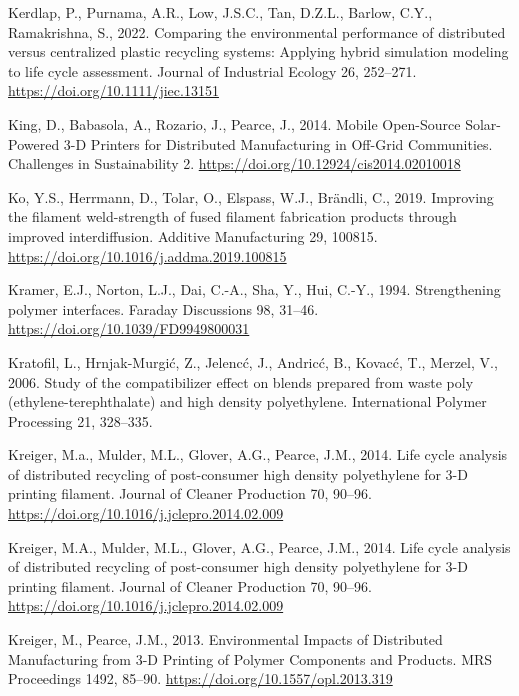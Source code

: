 \documentclass[
  12pt,
  number,
  review]{elsarticle}
\newlength{\cslhangindent}
\newlength{\cslentryspacingunit} %
\newenvironment{CSLReferences}[2] %
 {%
  \setlength{\parindent}{0pt}
  \ifodd #1
  \let\oldpar\par
  \def\par{\hangindent=\cslhangindent\oldpar}
  \fi
  \setlength{\parskip}{#2\cslentryspacingunit}
 }%
 {}
\begin{document}
\begin{CSLReferences}{1}{0}
\leavevmode{}%
Kerdlap, P., Purnama, A.R., Low, J.S.C., Tan, D.Z.L., Barlow, C.Y.,
Ramakrishna, S., 2022. Comparing the environmental performance of
distributed versus centralized plastic recycling systems: {Applying}
hybrid simulation modeling to life cycle assessment. Journal of
Industrial Ecology 26, 252--271.
\url{https://doi.org/10.1111/jiec.13151}

\leavevmode{}%
King, D., Babasola, A., Rozario, J., Pearce, J., 2014. Mobile
{Open-Source Solar-Powered} 3-{D Printers} for {Distributed
Manufacturing} in {Off-Grid Communities}. Challenges in Sustainability
2. \url{https://doi.org/10.12924/cis2014.02010018}

\leavevmode{}%
Ko, Y.S., Herrmann, D., Tolar, O., Elspass, W.J., Brändli, C., 2019.
Improving the filament weld-strength of fused filament fabrication
products through improved interdiffusion. Additive Manufacturing 29,
100815. \url{https://doi.org/10.1016/j.addma.2019.100815}

\leavevmode{}%
Kramer, E.J., Norton, L.J., Dai, C.-A., Sha, Y., Hui, C.-Y., 1994.
Strengthening polymer interfaces. Faraday Discussions 98, 31--46.
\url{https://doi.org/10.1039/FD9949800031}

\leavevmode{}%
Kratofil, L., Hrnjak-Murgić, Z., Jelencć, J., Andricć, B., Kovacć, T.,
Merzel, V., 2006. Study of the compatibilizer effect on blends prepared
from waste poly (ethylene-terephthalate) and high density polyethylene.
International Polymer Processing 21, 328--335.

\leavevmode{}%
Kreiger, M.a., Mulder, M.L., Glover, A.G., Pearce, J.M., 2014. Life
cycle analysis of distributed recycling of post-consumer high density
polyethylene for 3-{D} printing filament. Journal of Cleaner Production
70, 90--96. \url{https://doi.org/10.1016/j.jclepro.2014.02.009}

\leavevmode{}%
Kreiger, M.A., Mulder, M.L., Glover, A.G., Pearce, J.M., 2014. Life
cycle analysis of distributed recycling of post-consumer high density
polyethylene for 3-{D} printing filament. Journal of Cleaner Production
70, 90--96. \url{https://doi.org/10.1016/j.jclepro.2014.02.009}

\leavevmode{}%
Kreiger, M., Pearce, J.M., 2013. Environmental {Impacts} of {Distributed
Manufacturing} from 3-{D Printing} of {Polymer Components} and
{Products}. MRS Proceedings 1492, 85--90.
\url{https://doi.org/10.1557/opl.2013.319}


\end{CSLReferences}
\end{document}
